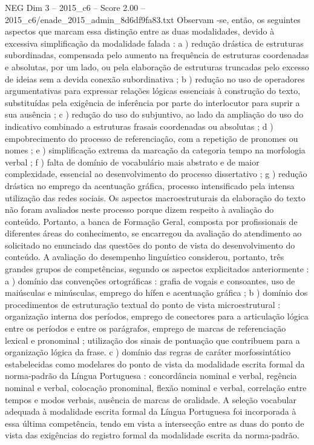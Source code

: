 \begin{textsample}{NEG Dim 3 – 2015\_c6 – Score 2.00 – 2015\_c6/enade\_2015\_admin\_8d6df9fa83.txt}
Observam -se, então, os seguintes aspectos que marcam essa distinção entre as duas modalidades, devido à excessiva simplificação da modalidade falada : a ) redução drástica de estruturas subordinadas, compensada pelo aumento na frequência de estruturas coordenadas e absolutas, por um lado, ou pela elaboração de estruturas truncadas pelo excesso de ideias sem a devida conexão subordinativa ; b ) redução no uso de operadores argumentativas para expressar relações lógicas essenciais à construção do texto, substituídas pela exigência de inferência por parte do interlocutor para suprir a sua ausência ; c ) redução do uso do subjuntivo, ao lado da ampliação do uso do indicativo combinado a estruturas frasais coordenadas ou absolutas ; d ) empobrecimento do processo de referenciação, com a repetição de pronomes ou nomes ; e ) simplificação extrema da marcação da categoria tempo na morfologia verbal ; f ) falta de domínio de vocabulário mais abstrato e de maior complexidade, essencial ao desenvolvimento do processo dissertativo ; g ) redução drástica no emprego da acentuação gráfica, processo intensificado pela intensa utilização das redes sociais.
Os aspectos macroestruturais da elaboração do texto não foram avaliados neste processo porque dizem respeito à avaliação do conteúdo.
Portanto, a banca de Formação Geral, composta por profissionais de diferentes áreas do conhecimento, se encarregou da avaliação do atendimento ao solicitado no enunciado das questões do ponto de vista do desenvolvimento do conteúdo.
A avaliação do desempenho linguístico considerou, portanto, três grandes grupos de competências, segundo os aspectos explicitados anteriormente : a ) domínio das convenções ortográficas : grafia de vogais e consoantes, uso de maiúsculas e minúsculas, emprego do hífen e acentuação gráfica ; b ) domínio dos procedimentos de estruturação textual do ponto de vista microestrutural : organização interna dos períodos, emprego de conectores para a articulação lógica entre os períodos e entre os parágrafos, emprego de marcas de referenciação lexical e pronominal ; utilização dos sinais de pontuação que contribuem para a organização lógica da frase. c ) domínio das regras de caráter morfossintático estabelecidas como modelares do ponto de vista da modalidade escrita formal da norma-padrão da Língua Portuguesa : concordância nominal e verbal, regência nominal e verbal, colocação pronominal, flexão nominal e verbal, correlação entre tempos e modos verbais, ausência de marcas de oralidade.
A seleção vocabular adequada à modalidade escrita formal da Língua Portuguesa foi incorporada à essa última competência, tendo em vista a intersecção entre as duas do ponto de vista das exigências do registro formal da modalidade escrita da norma-padrão.

\end{textsample}
